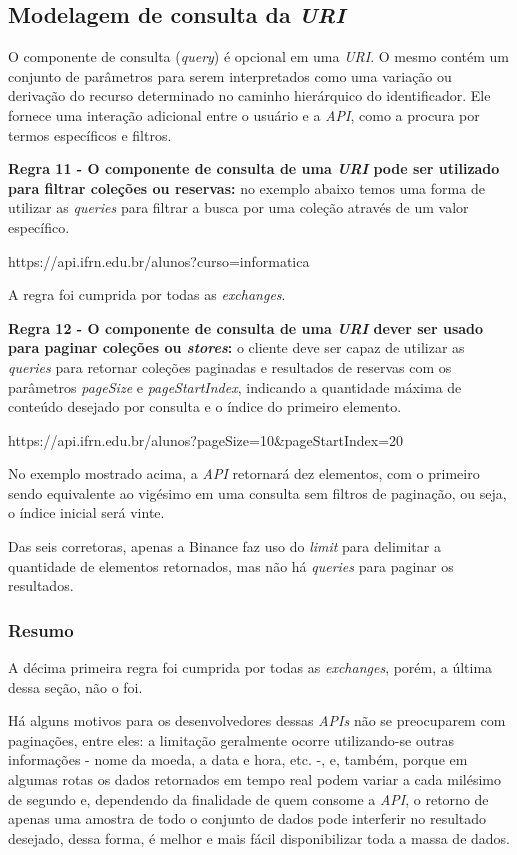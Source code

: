  
\subsection{Modelagem de consulta da \textit{URI}}

O componente de consulta (\textit{query}) é opcional em uma \textit{URI}. O mesmo contém um conjunto de parâmetros para serem interpretados como uma variação ou derivação do recurso determinado no caminho hierárquico do identificador. Ele fornece uma interação adicional entre o usuário e a \textit{API}, como a procura por termos específicos e filtros.

\textbf{Regra 11 - O componente de consulta de uma \textit{URI} pode ser utilizado para filtrar coleções ou reservas:} no exemplo abaixo temos uma forma de utilizar as \textit{queries} para filtrar a busca por uma coleção através de um valor específico.

\centerline{https://api.ifrn.edu.br/alunos?curso=informatica}

A regra foi cumprida por todas as \textit{exchanges}.

\textbf{Regra 12 - O componente de consulta de uma \textit{URI} dever ser usado para paginar coleções ou \textit{stores}:} o cliente deve ser capaz de utilizar as \textit{queries} para retornar coleções paginadas e resultados de reservas com os parâmetros \textit{pageSize} e \textit{pageStartIndex}, indicando a quantidade máxima de conteúdo desejado por consulta e o índice do primeiro elemento.

\centerline{https://api.ifrn.edu.br/alunos?pageSize=10\&pageStartIndex=20}

No exemplo mostrado acima, a \textit{API} retornará dez elementos, com o primeiro sendo equivalente ao vigésimo em uma consulta sem filtros de paginação, ou seja, o índice inicial será vinte.

Das seis corretoras, apenas a Binance faz uso do \textit{limit} para delimitar a quantidade de elementos retornados, mas não há \textit{queries} para paginar os resultados.

\subsubsection{Resumo}

A décima primeira regra foi cumprida por todas as \textit{exchanges}, porém, a última dessa seção, não o foi.

Há alguns motivos para os desenvolvedores dessas \textit{APIs} não se preocuparem com paginações, entre eles: a limitação geralmente ocorre utilizando-se outras informações - nome da moeda, a data e hora, etc. -, e, também, porque em algumas rotas os dados retornados em tempo real podem variar a cada milésimo de segundo e, dependendo da finalidade de quem consome a \textit{API}, o retorno de apenas uma amostra de todo o conjunto de dados pode interferir no resultado desejado, dessa forma, é melhor e mais fácil disponibilizar toda a massa de dados. 

